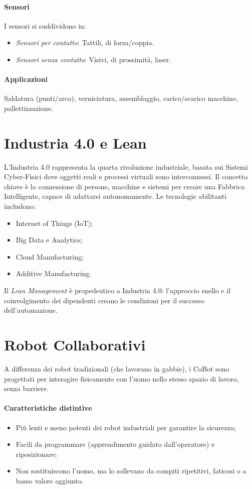 %
\paragraph{Sensori} I sensori si suddividono in:
\begin{itemize}
    \item \emph{Sensori per contatto}: Tattili, di forza/coppia.
    \item \emph{Sensori senza contatto}: Visivi, di prossimità, laser.
\end{itemize}

%
\paragraph{Applicazioni} Saldatura (punti/arco), verniciatura, assemblaggio, carico/scarico macchine, pallettizzazione.

%
\section{Industria 4.0 e Lean}
L'Industria 4.0 rappresenta la quarta rivoluzione industriale, basata sui Sistemi Cyber-Fisici dove oggetti reali e processi virtuali sono interconnessi. Il concetto chiave è la connessione di persone, macchine e sistemi per creare una Fabbrica Intelligente, capace di adattarsi autonomamente. Le tecnologie abilitanti includono:
\begin{itemize}
    \item Internet of Things (IoT);
    \item Big Data e Analytics;
    \item Cloud Manufacturing;
    \item Additive Manufacturing.
\end{itemize}
Il \emph{Lean Management} è propedeutico a Industria 4.0: l'approccio snello e il coinvolgimento dei dipendenti creano le condizioni per il successo dell'automazione.

%
\section{Robot Collaborativi}
A differenza dei robot tradizionali (che lavorano in gabbie), i CoBot sono progettati per interagire fisicamente con l'uomo nello stesso spazio di lavoro, senza barriere.
%
\paragraph{Caratteristiche distintive}
\begin{itemize}
    \item Più lenti e meno potenti dei robot industriali per garantire la sicurezza;
    \item Facili da programmare (apprendimento guidato dall'operatore) e riposizionare;
    \item Non sostituiscono l'uomo, ma lo sollevano da compiti ripetitivi, faticosi o a basso valore aggiunto.
\end{itemize}

